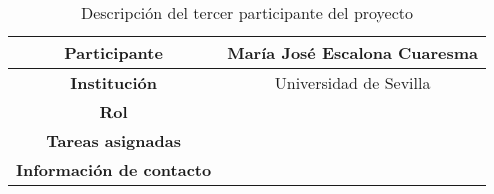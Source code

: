 \begin{table}[H]
    \centering
    \begin{tabular}{|c|c|}
    \hline
    \textbf{Participante} & María José Escalona Cuaresma \\
    \hline
    \textbf{Institución} & Universidad de Sevilla \\
    \hline
    \textbf{Rol} &  \\
    \hline
    \textbf{Tareas asignadas} & \\
    \hline
    \textbf{Información de contacto} & \\
    \hline
    \end{tabular}
\caption{Descripción del tercer participante del proyecto}
\label{tab:trazabilidadAlum}
\end{table}